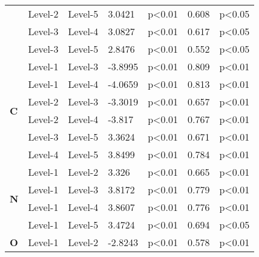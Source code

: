 \begin{longtable}{ |p{0.5cm}| p{1.5cm}|p{1.5cm}|p{1.3cm}| p{1.6cm}|p{1cm}|p{1.5cm}|  }
    &Level-2		&Level-5			&3.0421			&p<0.01			&0.608 		&p<0.05\\
    &Level-3		&Level-4			&3.0827			&p<0.01			&0.617 		&p<0.05\\
    &Level-3		&Level-5			&2.8476			&p<0.01			&0.552		&p<0.05\\
    \hline
    \hline
    \multirow{6}{*}{\textbf{C}}
    &Level-1		&Level-3			&-3.8995			&p<0.01			&0.809 		&p<0.01\\
    &Level-1		&Level-4			&-4.0659			&p<0.01			&0.813 		&p<0.01\\
    &Level-2		&Level-3			&-3.3019			&p<0.01			&0.657		&p<0.01\\
    &Level-2		&Level-4			&-3.817			&p<0.01			&0.767 		&p<0.01\\
    &Level-3		&Level-5			&3.3624			&p<0.01			&0.671 		&p<0.01\\
    &Level-4		&Level-5			&3.8499			&p<0.01			&0.784 		&p<0.01\\
    \hline
    \hline
    \multirow{4}{*}{\textbf{N}}
    &Level-1		&Level-2			&3.326			&p<0.01			&0.665 		&p<0.01\\
    &Level-1		&Level-3			&3.8172			&p<0.01			&0.779 		&p<0.01\\
    &Level-1		&Level-4			&3.8607			&p<0.01			&0.776  		&p<0.01\\
    &Level-1		&Level-5			&3.4724			&p<0.01			&0.694		&p<0.05\\
    \hline
    \hline
    \multirow{1}{*}{\textbf{O}}
    &Level-1		&Level-2			&-2.8243			&p<0.01			&0.578 		&p<0.01\\
    \hline
\end{longtable}

